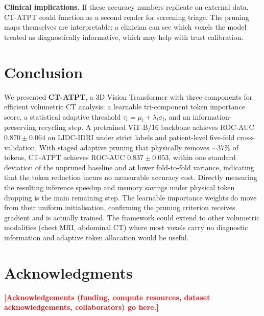 \documentclass[journal]{IEEEtran}
\newcommand{\R}[1]{\textcolor{red}{\textbf{[#1]}}}
\begin{document}
\textbf{Clinical implications.} If these accuracy numbers replicate on
external data, CT-ATPT could function as a second reader for screening
triage. The pruning maps themselves are interpretable: a clinician can see
which voxels the model treated as diagnostically informative, which may help
with trust calibration.

\section{Conclusion}\label{sec:conclusion}
We presented \textbf{CT-ATPT}, a 3D Vision Transformer with three components
for efficient volumetric CT analysis: a learnable tri-component token
importance score, a statistical adaptive threshold
$\tau_l = \mu_l + \lambda_l \sigma_l$, and an information-preserving recycling
step. A pretrained ViT-B/16 backbone achieves ROC-AUC $0.870 \pm 0.064$ on
LIDC-IDRI under strict labels and patient-level five-fold cross-validation.
With staged adaptive pruning that physically removes ${\sim}37\%$ of tokens,
CT-ATPT achieves ROC-AUC $0.837 \pm 0.053$, within one standard deviation of
the unpruned baseline and at lower fold-to-fold variance, indicating that the
token reduction incurs no measurable accuracy cost. Directly measuring the
resulting inference speedup and memory savings under physical token dropping
is the main remaining step. The learnable importance weights do move from
their uniform initialisation, confirming the pruning criterion receives
gradient and is actually trained. The framework could extend to other volumetric modalities
(chest MRI, abdominal CT) where most voxels carry no diagnostic information
and adaptive token allocation would be useful.

\section*{Acknowledgments}
\R{Acknowledgements (funding, compute resources, dataset acknowledgements,
collaborators) go here.}

\appendices
\end{document}
